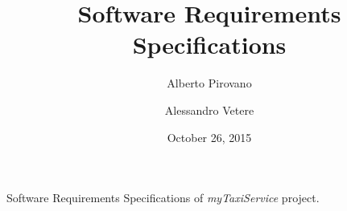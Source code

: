 \documentclass{article}      %
\title{Software Requirements Specifications}    %
\author{Alberto Pirovano \and Alessandro Vetere}      %
\date{October 26, 2015}      %
\newcommand{\myTaxiService}[0]{\emph{myTaxiService}}
\newcommand{\sectionBaseDir}[1]{./section_#1}
\newcommand{\sectionTexPath}[1]{\sectionBaseDir{#1}/section_#1.tex}
\newcommand{\inputSection}[1]{\newpage}}
\begin{document}
\maketitle                   %
Software Requirements Specifications of \myTaxiService{} project.
\newpage
\tableofcontents             %
\inputSection{1}
\inputSection{2}
\inputSection{3}
\end{document}
